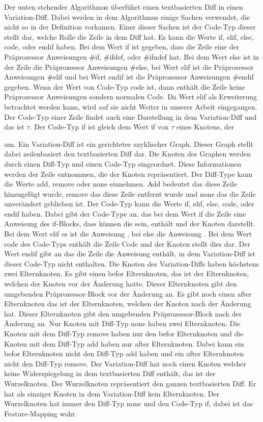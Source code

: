 Der unten stehender Algorithmus überführt einen textbasierten Diff in einen Variation-Diff. Dabei werden in dem Algorithmus einige Sachen verwendet, die nicht so in der Definition vorkamen. Einer dieser Sachen ist der Code-Typ dieser stellt dar, welche Rolle die Zeile in dem Diff hat. Es kann die Werte if, elif, else, code, oder endif haben. Bei dem Wert if ist gegeben, dass die Zeile eine der Präprozessor Anweisungen \#if, \#ifdef, oder \#ifndef hat. Bei dem Wert else ist in der Zeile die Präprozessor Anweisungen \#else, bei Wert elif ist  die Präprozessor Anweisungen \#elif und bei Wert endif ist  die Präprozessor Anweisungen \#endif gegeben. Wenn der Wert von Code-Typ code ist, dann enthält die Zeile keine Präprozessor Anweisungen sondern normalen Code. Da Wert elif als Erweiterung betrachtet werden kann, wird auf sie nicht Weiter in unserer Arbeit eingegangen. Der Code-Typ einer Zeile findet auch eine Darstellung in dem Variation-Diff und das ist $\tau$. Der Code-Typ if ist gleich dem Wert if von $\tau$ eines Knotens, der 




 um. Ein Variation-Diff ist ein gerichteter azyklischer Graph. Dieser Graph stellt dabei zeilenbasiert den textbasierten Diff dar. Die Knoten des Graphen werden durch einen Diff-Typ und einen Code-Typ eingeordnet. Diese Informationen werden der Zeile entnommen, die der Knoten repräsentiert. Der Diff-Type kann die Werte add, remove oder none einnehmen. Add bedeutet das diese Zeile hinzugefügt wurde, remove das diese Zeile entfernt wurde und none das die Zeile unverändert geblieben ist. Der Code-Typ kann die Werte if, elif, else, code, oder endif haben. Dabei gibt der Code-Type an, das bei dem Wert if die Zeile eine Anweisung des if-Blocks, dass können die sein, enthält und der Knoten darstellt. Bei dem Wert elif es ist die Anweisung , bei else die Anweisung . Bei dem Wert code des Code-Typs enthält die Zeile Code und der Knoten stellt dies dar. Der Wert endif gibt an das die Zeile die Anweisung enthält, in dem Variation-Diff ist dieser Code-Typ nicht enthalten. Die Knoten des Variation-Diffs haben höchstens zwei Elternknoten. Es gibt einen befor Elternknoten, das ist der Elternknoten, welchen der Knoten vor der Änderung hatte. Dieser Elternknoten gibt den umgebenden Präprozessor-Block vor der Änderung an. Es gibt noch einen after Elternknoten das ist der Elternknoten, welchen der Knoten nach der Änderung hat. Dieser Elternknoten gibt den umgebenden Präprozessor-Block nach der Änderung an. Nur Knoten mit Diff-Typ none haben zwei Elternknoten. Die Knoten mit dem Diff-Typ remove haben nur den befor Elternknoten und die Knoten mit dem Diff-Typ add haben nur after Elternknoten. Dabei kann ein befor Elternknoten nicht den Diff-Typ add haben und ein after Elternknoten nicht den Diff-Typ remove. Der Variation-Diff hat noch einen Knoten welcher keine Widerspiegelung in dem textbasierten Diff enthält, das ist der Wurzelknoten. Der Wurzelknoten repräsentiert den ganzen textbasierten Diff. Er hat als einziger Knoten in dem Variation-Diff kein Elternknoten. Der Wurzelknoten hat immer den Diff-Typ none und den Code-Typ if, dabei ist das Feature-Mapping wahr.



